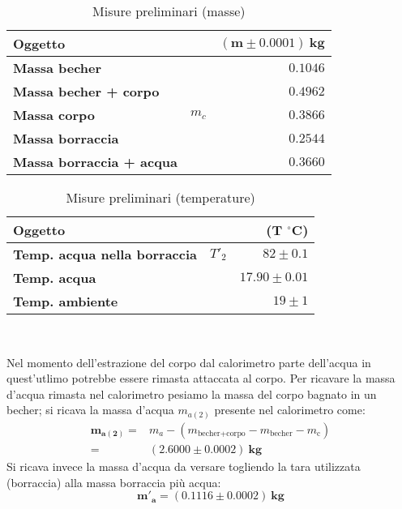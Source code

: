 \documentclass{article}
\begin{document}
	\vspace{1cm}
	\begin{minipage}{0.4\textwidth}
		\begin{table}[H] \centering
			\begin{small}
				\begin{tabular}{@{}lrr@{}}\toprule
					\textbf{Oggetto}&  & \(\boldsymbol{(m \pm 0.0001) \SI{}{\kilogram}}\) \\ \midrule
					\textbf{Massa becher}	&	 & \(0.1046\)   \\  \hdashline
					\textbf{Massa becher + corpo}	& 	 & \(0.4962\)   \\  \hdashline
					\textbf{Massa corpo}	& \(m_{c}\)	 & \(0.3866\)   \\  \hdashline
					\textbf{Massa borraccia}	&	 & \(0.2544\)   \\\hdashline
					\textbf{Massa borraccia + acqua}	&	 & \(0.3660\)   \\  
					\bottomrule
				\end{tabular}
			\end{small}
			\caption{Misure preliminari (masse)}
		\end{table}
	\end{minipage}
	\begin{minipage}{0.6\textwidth}
		\begin{table}[H] \centering
			\begin{small}
				\begin{tabular}{@{}lrr@{}}\toprule
					\textbf{Oggetto}					&  			& \textbf{(\(\boldsymbol{T}\)} \(\boldsymbol{^\circ C}\))\\ \midrule
					\textbf{Temp. acqua nella borraccia}	& 	\(T'_{2}\)		& \(82 \pm 0.1\)	 \\  \hdashline
					\textbf{Temp. acqua}				&					&\(17.90 \pm 0.01\)		 	 \\  \hdashline
					\textbf{Temp. ambiente}				&					& \(19 \pm 1\)		 	  \\  
					\bottomrule
				\end{tabular}
			\end{small}
			\caption{Misure preliminari (temperature)}
		\end{table}
	\end{minipage} \\
	\vspace{0.5cm}
	
	Nel momento dell'estrazione del corpo dal calorimetro parte dell'acqua in quest'utlimo potrebbe essere rimasta attaccata al corpo. Per ricavare la massa d'acqua rimasta nel calorimetro pesiamo la massa del corpo bagnato in un becher; si ricava la massa d'acqua \(m_{a(2)}\) presente nel calorimetro come:
	\begin{align*}
		\boldsymbol{	m_{a(2)} =}& m_{a} - (m_{\text{becher+corpo}} - m_{\text{becher}} - m_{\text{c}}) \\
		\boldsymbol{=}& \boldsymbol{(2.6000 \pm 0.0002) \SI{}{\kilogram}}
	\end{align*}
	Si ricava invece la massa d'acqua da versare togliendo la tara utilizzata (borraccia) alla massa borraccia più acqua:
	\[ 
	\boldsymbol{m'_{a} = (0.1116 \pm	0.0002)\SI{}{\kilogram}}
	\]
	
\end{document}
